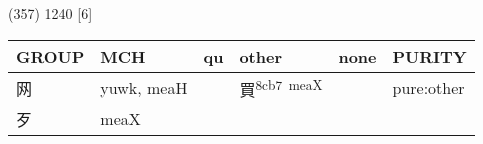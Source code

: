 \documentclass[14pt,a4paper]{scrartcl}
\begin{document}
(357) 1240 {[}6{]}

\begin{longtable}[c]{@{}llllll@{}}
\toprule
\begin{minipage}[b]{0.14\columnwidth}\raggedright\strut
GROUP
\strut\end{minipage} &
\begin{minipage}[b]{0.14\columnwidth}\raggedright\strut
MCH
\strut\end{minipage} &
\begin{minipage}[b]{0.14\columnwidth}\raggedright\strut
qu
\strut\end{minipage} &
\begin{minipage}[b]{0.14\columnwidth}\raggedright\strut
other
\strut\end{minipage} &
\begin{minipage}[b]{0.14\columnwidth}\raggedright\strut
none
\strut\end{minipage} &
\begin{minipage}[b]{0.14\columnwidth}\raggedright\strut
PURITY
\strut\end{minipage}\tabularnewline
\midrule
\endhead
\begin{minipage}[t]{0.14\columnwidth}\raggedright\strut
网
\strut\end{minipage} &
\begin{minipage}[t]{0.14\columnwidth}\raggedright\strut
yuwk, meaH
\strut\end{minipage} &
\begin{minipage}[t]{0.14\columnwidth}\raggedright\strut
\strut\end{minipage} &
\begin{minipage}[t]{0.14\columnwidth}\raggedright\strut
買\textsuperscript{8cb7~meaX}
\strut\end{minipage} &
\begin{minipage}[t]{0.14\columnwidth}\raggedright\strut
\strut\end{minipage} &
\begin{minipage}[t]{0.14\columnwidth}\raggedright\strut
pure:other
\strut\end{minipage}\tabularnewline
\begin{minipage}[t]{0.14\columnwidth}\raggedright\strut
歹
\strut\end{minipage} &
\begin{minipage}[t]{0.14\columnwidth}\raggedright\strut
meaX
\strut\end{minipage} &
\begin{minipage}[t]{0.14\columnwidth}\raggedright\strut

\end{minipage}
\end{longtable}
\end{document}
